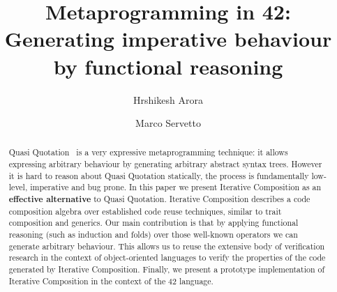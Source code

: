 \documentclass[runningheads]{llncs}
\begin{document}
%
\title{Metaprogramming in 42:
Generating imperative behaviour by functional reasoning}
%
%
\author{Hrshikesh Arora %
\and
Marco Servetto %
}
%
%
%
\maketitle              %
%
\begin{abstract}
Quasi Quotation~\cite{moggi1999idealized,pitman1980special,sheard2002template} is a very expressive metaprogramming technique: it allows expressing arbitrary behaviour by
generating arbitrary abstract syntax trees.
However it is hard to reason about Quasi Quotation statically,
the process is fundamentally low-level, imperative and bug prone.
In this paper we present Iterative Composition as
an \textbf{effective alternative} to Quasi Quotation.
Iterative Composition describes a code composition algebra over established code reuse techniques,
similar to trait composition and generics.
Our main contribution is that by applying functional reasoning (such as induction and folds)
over those well-known operators we can generate arbitrary behaviour.
This allows us to reuse the extensive body of verification research in the 
context of object-oriented languages to verify the properties
of the code generated by Iterative Composition.
Finally, we present a prototype implementation of Iterative Composition in the context of the 42 language.


%
%
%


\end{abstract}
\end{document}
